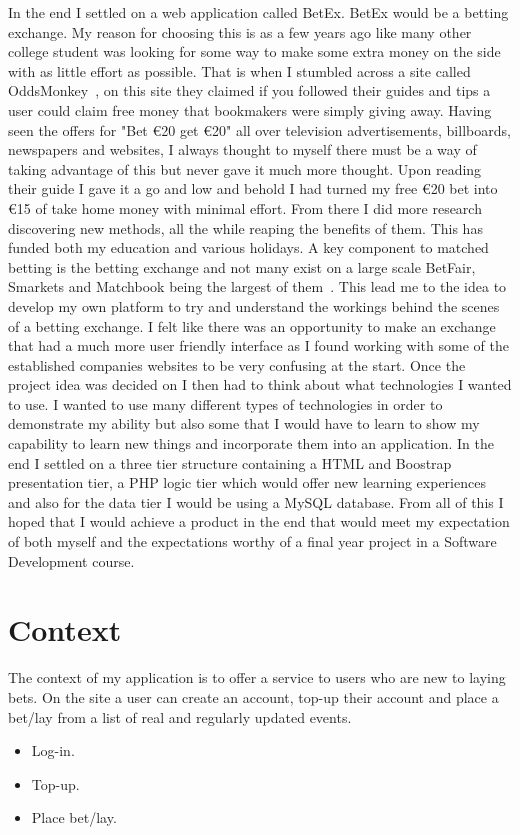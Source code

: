 In the end I settled on a web application called BetEx. BetEx would be a betting exchange. My reason for choosing this is as a few years ago like many other college student was looking for some way to make some extra money on the side with as little effort as possible. That is when I stumbled across a site called OddsMonkey~\cite{oddsMonkey}, on this site they claimed if you followed their guides and tips a user could claim free money that bookmakers were simply giving away. Having seen the offers for "Bet €20 get €20" all over television advertisements, billboards, newspapers and websites, I always thought to myself there must be a way of taking advantage of this but never gave it much more thought. Upon reading their guide I gave it a go and low and behold I had turned my free €20 bet into €15 of take home money with minimal effort. From there I did more research discovering new methods, all the while reaping the benefits of them. This has funded both my education and various holidays. A key component to matched betting is the betting exchange and not many exist on a large scale BetFair, Smarkets and Matchbook being the largest of them~\cite{companies}. This lead me to the idea to develop my own platform to try and understand the workings behind the scenes of a betting exchange. I felt like there was an opportunity to make an exchange that had a much more user friendly interface as I found working with some of the established companies websites to be very confusing at the start.
Once the project idea was decided on I then had to think about what technologies I wanted to use. I wanted to use many different types of technologies in order to demonstrate my ability but also some that I would have to learn to show my capability to learn new things and incorporate them into an application. In the end I settled on a three tier structure containing a HTML and Boostrap presentation tier, a PHP logic tier which would offer new learning experiences and also for the data tier I would be using a MySQL database.
From all of this I hoped that I would achieve a product in the end that would meet my expectation of both myself and the expectations worthy of a final year project in a Software Development course.

\chapter{Context}
The context of my application is to offer a service to users who are new to laying bets. On the site a user can create an account, top-up their account and place a bet/lay from a list of real and regularly updated events.
\begin{itemize}
\item Log-in.
\item Top-up.
\item Place bet/lay.
\end{itemize}

